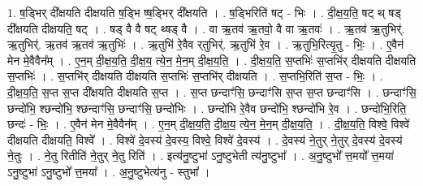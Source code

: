 \documentclass[17pt]{extarticle}
\begin{document}
1. ष॒ड्भिर् दी᳚क्षयति दीक्षयति ष॒ड्भि ष्ष॒ड्भिर् दी᳚क्षयति । . ष॒ड्भिरिति॑ षट् - भिः । . दी॒क्ष॒य॒ति॒ षट् थ् षड् दी᳚क्षयति दीक्षयति॒ षट् । . षड् वै वै षट् थ्षड् वै । . वा ऋ॒तव॑ ऋ॒तवो॒ वै वा ऋ॒तवः॑ । . ऋ॒तव॑ ऋ॒तुभिर्॑. ऋ॒तुभिर्॑. ऋ॒तव॑ ऋ॒तव॑ ऋ॒तुभिः॑ । . ऋ॒तुभि॑ रे॒वैव र्‌तुभिर्॑. ऋ॒तुभि॑ रे॒व । . ऋ॒तुभि॒रित्यृ॒तु - भिः॒ । . ए॒वैन॑ मेन मे॒वैवैन᳚म् । . ए॒न॒म् दी॒क्ष॒य॒ति॒ दी॒क्ष॒य॒ त्ये॒न॒ मे॒न॒म् दी॒क्ष॒य॒ति॒ । . दी॒क्ष॒य॒ति॒ स॒प्तभिः॑ स॒प्तभि॑र् दीक्षयति दीक्षयति स॒प्तभिः॑ । . स॒प्तभि॑र् दीक्षयति दीक्षयति स॒प्तभिः॑ स॒प्तभि॑र् दीक्षयति । . स॒प्तभि॒रिति॑ स॒प्त - भिः॒ । . दी॒क्ष॒य॒ति॒ स॒प्त स॒प्त दी᳚क्षयति दीक्षयति स॒प्त । . स॒प्त छन्दाꣳ॑सि॒ छन्दाꣳ॑सि स॒प्त स॒प्त छन्दाꣳ॑सि । . छन्दाꣳ॑सि॒ छन्दो॑भि॒ श्छन्दो॑भि॒ श्छन्दाꣳ॑सि॒ छन्दाꣳ॑सि॒ छन्दो॑भिः । . छन्दो॑भि रे॒वैव छन्दो॑भि॒ श्छन्दो॑भि रे॒व । . छन्दो॑भि॒रिति॒ छन्दः॑ - भिः॒ । . ए॒वैन॑ मेन मे॒वैवैन᳚म् । . ए॒न॒म् दी॒क्ष॒य॒ति॒ दी॒क्ष॒य॒ त्ये॒न॒ मे॒न॒म् दी॒क्ष॒य॒ति॒ । . दी॒क्ष॒य॒ति॒ विश्वे॒ विश्वे॑ दीक्षयति दीक्षयति॒ विश्वे᳚ । . विश्वे॑ दे॒वस्य॑ दे॒वस्य॒ विश्वे॒ विश्वे॑ दे॒वस्य॑ । . दे॒वस्य॑ ने॒तुर् ने॒तुर् दे॒वस्य॑ दे॒वस्य॑ ने॒तुः । . ने॒तु रितीति॑ ने॒तुर् ने॒तु रिति॑ । . इत्य॑नु॒ष्टुभा॑ ऽनु॒ष्टुभेती त्य॑नु॒ष्टुभा᳚ । . अ॒नु॒ष्टुभो᳚ त्त॒मयो᳚ त्त॒मया॑ ऽनु॒ष्टुभा॑ ऽनु॒ष्टुभो᳚ त्त॒मया᳚ । . अ॒नु॒ष्टुभेत्य॑नु - स्तुभा᳚ । \newline
\end{document}

